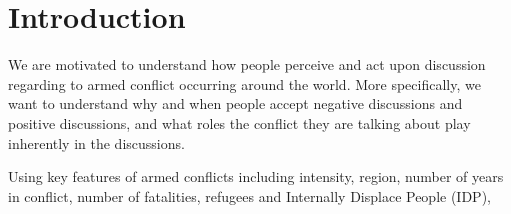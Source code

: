 \section{Introduction}
We are motivated to understand how people perceive and act upon discussion regarding to armed conflict occurring around the world. More specifically, we want to understand why and when people accept negative discussions and positive discussions, and what roles the conflict they are talking about play inherently in the discussions. 

Using key features of armed conflicts including intensity, region, number of years in conflict, number of fatalities, refugees and Internally Displace People (IDP), 